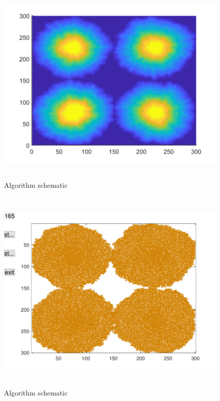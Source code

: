\documentclass{mcmthesis}
\begin{document}
\begin{figure}[H] 
	\centering 
	\includegraphics[height=10cm]{./T5Figure/K1N1/K1N1A.pdf}
	\caption{Algorithm schematic}
\end{figure}
\begin{figure}[H] 
	\centering 
	\includegraphics[height=10cm]{./T5Figure/K1N1/K1N1F.pdf}
	\caption{Algorithm schematic}
\end{figure}
\end{document}
